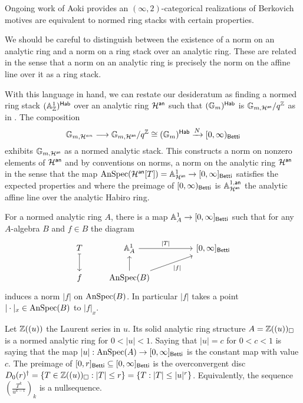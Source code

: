 Ongoing work of Aoki provides an $(\infty,2)$-categorical realizations of Berkovich motives are equivalent to normed ring stacks with certain properties. 
\begin{remark}
    We should be careful to distinguish between the existence of a norm on an analytic ring and a norm on a ring stack over an analytic ring. These are related in the sense that a norm on an analytic ring is precisely the norm on the affine line over it as a ring stack. 
\end{remark}
With this language in hand, we can restate our desideratum as finding a normed ring stack $(\mathbb{A}^{1}_{\mathbb{Z}})^{\mathsf{Hab}}$ over an analytic ring $\mathcal{H}^{\mathsf{an}}$ such that $(\mathbb{G}_{m})^{\mathsf{Hab}}$ is $\mathbb{G}_{m,\mathcal{H}^{\mathsf{an}}}/q^{\mathbb{Z}}$ as in . The composition 
$$\mathbb{G}_{m,\mathcal{H}^{an}}\longrightarrow\mathbb{G}_{m,\mathcal{H}^{\mathsf{an}}}/q^{\mathbb{Z}}\cong(\mathbb{G}_{m})^{\mathsf{Hab}}\xrightarrow{N}[0,\infty)_{\mathsf{Betti}}$$
exhibits $\mathbb{G}_{m,\mathcal{H}^{\mathsf{an}}}$ as a normed analytic stack. This constructs a norm on nonzero elements of $\mathcal{H}^{\mathsf{an}}$ and by conventions on norms, a norm on the analytic ring $\mathcal{H}^{\mathsf{an}}$ in the sense that the map $\mathrm{AnSpec}(\mathcal{H}^{\mathsf{an}}[T])=\mathbb{A}^{1}_{\mathcal{H}^{\mathsf{an}}}\to[0,\infty]_{\mathsf{Betti}}$ satisfies the expected properties and where the preimage of $[0,\infty)_{\mathsf{Betti}}$ is $\mathbb{A}^{1,\mathsf{an}}_{\mathcal{H}^{\mathsf{an}}}$ the analytic affine line over the analytic Habiro ring. 
\begin{example}
    For a normed analytic ring $A$, there is a map $\mathbb{A}^{1}_{A}\to[0,\infty]_{\mathsf{Betti}}$ such that for any $A$-algebra $B$ and $f\in B$ the diagram 
    $$%
    \begin{tikzcd}
        T & {\A^{1}_{A}} && {[0,\infty]_{\Betti}} \\
        f & {\AnSpec(B)}
        \arrow[maps to, from=1-1, to=2-1]
        \arrow["{|T|}", from=1-2, to=1-4]
        \arrow[from=2-2, to=1-2]
        \arrow["{|f|}"', from=2-2, to=1-4]
    \end{tikzcd}$$
    induces a norm $|f|$ on $\mathrm{AnSpec}(B)$. In particular $|f|$ takes a point $|\cdot|_{x}\in\mathrm{AnSpec}(B)$ to $|f|_{x}$.  
\end{example}
\begin{example}
    Let $\mathbb{Z}((u))$ the Laurent series in $u$. Its solid analytic ring structure $A=\mathbb{Z}((u))_{\square}$ is a normed analytic ring for $0<|u|<1$. Saying that $|u|=c$ for $0<c<1$ is saying that the map $|u|:\mathrm{AnSpec}(A)\to[0,\infty]_{\mathsf{Betti}}$ is the constant map with value $c$. The preimage of $[0,r]_{\mathsf{Betti}}\subseteq[0,\infty]_{\mathsf{Betti}}$ is the overconvergent disc $D_{0}(r)^{\dagger}=\{T\in\mathbb{Z}((u))_{\square}:|T|\leq r\}=\{T:|T|\leq |u|^{r}\}$. Equivalently, the sequence $\left(\frac{T^{k}}{u^{k-1}}\right)_{k}$ is a nullsequence. 
\end{example}
